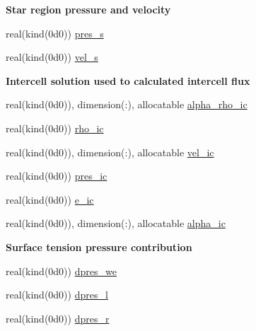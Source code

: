 \begin{Indent}\textbf{ Star region pressure and velocity}\par
\begin{DoxyCompactItemize}
\item 
real(kind(0d0)) \hyperlink{namespacem__riemann__solvers_a41ed4fe5b767afd06561f8618d1d7012}{pres\+\_\+s}
\item 
real(kind(0d0)) \hyperlink{namespacem__riemann__solvers_a594596688927700679b18b484a495504}{vel\+\_\+s}
\end{DoxyCompactItemize}
\end{Indent}
\begin{Indent}\textbf{ Intercell solution used to calculated intercell flux}\par
\begin{DoxyCompactItemize}
\item 
real(kind(0d0)), dimension(\+:), allocatable \hyperlink{namespacem__riemann__solvers_a5f6f2613083fc30ff684c4183014a67c}{alpha\+\_\+rho\+\_\+ic}
\item 
real(kind(0d0)) \hyperlink{namespacem__riemann__solvers_a45a3cc332ef2fd7fc391a4ae82763f1a}{rho\+\_\+ic}
\item 
real(kind(0d0)), dimension(\+:), allocatable \hyperlink{namespacem__riemann__solvers_a81bfe96b264a5bba316c60965e787cbf}{vel\+\_\+ic}
\item 
real(kind(0d0)) \hyperlink{namespacem__riemann__solvers_a6c0b79ed34cb9be88abdd713eb207295}{pres\+\_\+ic}
\item 
real(kind(0d0)) \hyperlink{namespacem__riemann__solvers_ac997c4db6eac9f175803bc4fd81ef096}{e\+\_\+ic}
\item 
real(kind(0d0)), dimension(\+:), allocatable \hyperlink{namespacem__riemann__solvers_a0e605952054968421a3e444c8ba71063}{alpha\+\_\+ic}
\end{DoxyCompactItemize}
\end{Indent}
\begin{Indent}\textbf{ Surface tension pressure contribution}\par
\begin{DoxyCompactItemize}
\item 
real(kind(0d0)) \hyperlink{namespacem__riemann__solvers_a2378fe152ecbad0e98558ae177297493}{dpres\+\_\+we}
\item 
real(kind(0d0)) \hyperlink{namespacem__riemann__solvers_abc4d393041248b9e5f72a38f797e4683}{dpres\+\_\+l}
\item 
real(kind(0d0)) \hyperlink{namespacem__riemann__solvers_a25a8dae8bbd769f28c67f1747520f373}{dpres\+\_\+r}
\end{DoxyCompactItemize}
\end{Indent}
